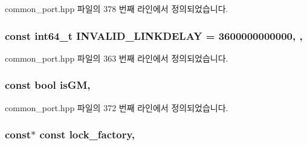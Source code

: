 common\+\_\+port.\+hpp 파일의 378 번째 라인에서 정의되었습니다.

\subsubsection[{\texorpdfstring{I\+N\+V\+A\+L\+I\+D\+\_\+\+L\+I\+N\+K\+D\+E\+L\+AY}{INVALID_LINKDELAY}}]{\setlength{\rightskip}{0pt plus 5cm}const {\bf int64\+\_\+t} I\+N\+V\+A\+L\+I\+D\+\_\+\+L\+I\+N\+K\+D\+E\+L\+AY = 3600000000000\hspace{0.3cm}{\ttfamily [static]}, {\ttfamily [protected]}, {\ttfamily [inherited]}}\hypertarget{class_common_port_a12f51c79445b27ce04e3693f4d5093d7}{}\label{class_common_port_a12f51c79445b27ce04e3693f4d5093d7}


common\+\_\+port.\+hpp 파일의 363 번째 라인에서 정의되었습니다.

\subsubsection[{\texorpdfstring{is\+GM}{isGM}}]{\setlength{\rightskip}{0pt plus 5cm}const {\bf bool} is\+GM\hspace{0.3cm}{\ttfamily [protected]}, {\ttfamily [inherited]}}\hypertarget{class_common_port_a3e52b9e84817ee3877eb51e6e0cba296}{}\label{class_common_port_a3e52b9e84817ee3877eb51e6e0cba296}


common\+\_\+port.\+hpp 파일의 372 번째 라인에서 정의되었습니다.

\subsubsection[{\texorpdfstring{lock\+\_\+factory}{lock_factory}}]{ const$\ast$ const lock\+\_\+factory\hspace{0.3cm}{\ttfamily [protected]}, {\ttfamily [inherited]}}\hypertarget{class_common_port_a79c67e28bcaacaa0f11c04682d085b36}{}\label{class_common_port_a79c67e28bcaacaa0f11c04682d085b36}



